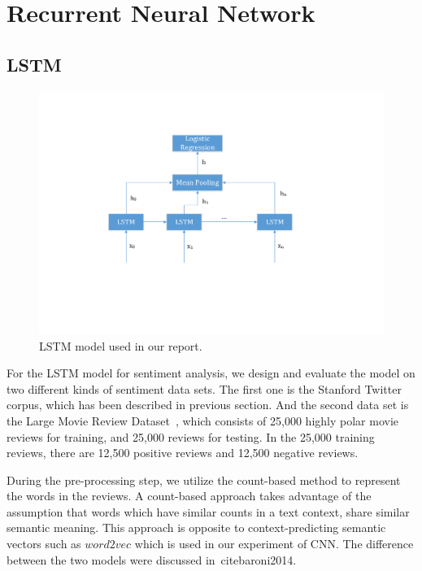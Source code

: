 \section{Recurrent Neural Network}

\subsection{LSTM}

\begin{figure}[tbp]
\centering
\includegraphics[scale=0.6]{figure/lstm_model.pdf}
\caption{LSTM model used in our report.}
\label{fig:lstm_model}
\end{figure}

For the LSTM model for sentiment analysis, we design and evaluate the model on two different kinds of sentiment data sets. The first one is the Stanford Twitter corpus, which has been described in previous section. And the second data set is the Large Movie Review Dataset~\cite{maas2011}, which consists of 25,000 highly polar movie reviews for training, and 25,000 reviews for testing. In the 25,000 training reviews, there are 12,500 positive reviews and 12,500 negative reviews.

During the pre-processing step, we utilize the count-based method to represent the words in the reviews. A count-based approach takes advantage of the assumption that words which have similar counts in a text context, share similar semantic meaning. This approach is opposite to context-predicting semantic vectors such as $word2vec$ which is used in our experiment of CNN. The difference between the two models were discussed in~cite{baroni2014}. 


